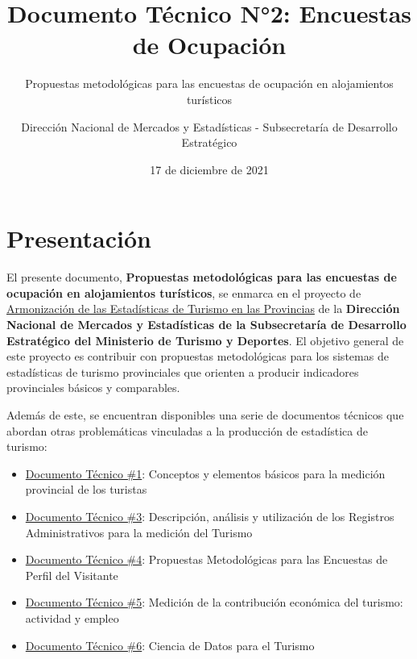 \documentclass[
]{book}
\title{Documento Técnico N°2: Encuestas de Ocupación}
\subtitle{Propuestas metodológicas para las encuestas de ocupación en alojamientos turísticos}
\author{Dirección Nacional de Mercados y Estadísticas - Subsecretaría de Desarrollo Estratégico}
\date{17 de diciembre de 2021}
\let\oldmaketitle\maketitle
\begin{document}
\maketitle


\newpage

\let\maketitle\oldmaketitle
\maketitle

{
\setcounter{tocdepth}{1}
\tableofcontents
}
\hypertarget{presentaciuxf3n}{%
\chapter*{Presentación}\label{presentaciuxf3n}}

El presente documento, \textbf{Propuestas metodológicas para las encuestas de ocupación en alojamientos turísticos}, se enmarca en el proyecto de \href{https://armonizacion.yvera.tur.ar//}{Armonización de las Estadísticas de Turismo en las Provincias} de la \textbf{Dirección Nacional de Mercados y Estadísticas de la Subsecretaría de Desarrollo Estratégico del Ministerio de Turismo y Deportes}. El objetivo general de este proyecto es contribuir con propuestas metodológicas para los sistemas de estadísticas de turismo provinciales que orienten a producir indicadores provinciales básicos y comparables.

Además de este, se encuentran disponibles una serie de documentos técnicos que abordan otras problemáticas vinculadas a la producción de estadística de turismo:

\begin{itemize}
\item
  \href{https://dnme-minturdep.github.io/DT1_medicion_turismo/}{Documento Técnico \#1}: Conceptos y elementos básicos para la medición provincial de los turistas
\item
  \href{https://dnme-minturdep.github.io/DT3_registros_adminsitrativos/}{Documento Técnico \#3}: Descripción, análisis y utilización de los Registros Administrativos para la medición del Turismo
\item
  \href{https://dnme-minturdep.github.io/DT4_perfiles/}{Documento Técnico \#4}: Propuestas Metodológicas para las Encuestas de Perfil del Visitante
\item
  \href{https://dnme-minturdep.github.io/DT5_actividad_empleo/}{Documento Técnico \#5}: Medición de la contribución económica del turismo: actividad y empleo
\item
  \href{https://dnme-minturdep.github.io/DT6_ciencia_de_datos_turismo/}{Documento Técnico \#6}: Ciencia de Datos para el Turismo
\end{itemize}
\end{document}

